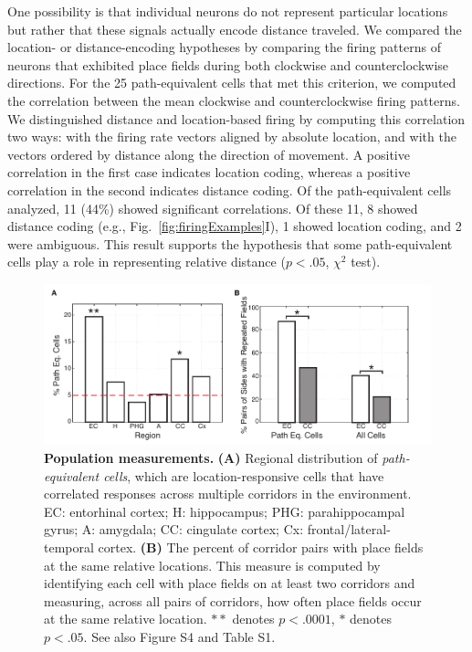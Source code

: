 One possibility is that individual neurons do not represent particular locations but rather that these  signals actually encode distance traveled.  We compared the location- or distance-encoding hypotheses  by comparing the firing patterns of neurons that exhibited place fields during both clockwise and counterclockwise directions. For the 25 path-equivalent cells that met this criterion, we computed the correlation between the mean clockwise and counterclockwise firing patterns. We distinguished distance and location-based firing by computing this correlation two ways: with the firing rate vectors aligned by absolute location, and with the vectors ordered by distance along the direction of movement. A positive correlation in the first case indicates location coding, whereas a positive correlation in the second indicates distance coding. Of the path-equivalent cells analyzed, 11 (44\%) showed significant correlations. Of these 11, 8 showed distance coding  (e.g., Fig.~\ref{fig:firingExamples}I), 1 showed location coding, and 2 were ambiguous. This result supports the hypothesis that some path-equivalent cells  play a role in representing relative distance  ($p<.05$, $\chi^2$ test).




\begin{figure}[t]
\centering
\includegraphics[width=.99\textwidth]{./tex/linearGrids/figs/Figure4}
\caption[Population measurements]{\textbf{Population measurements.}  \textbf{(A)} Regional distribution of \emph{path-equivalent cells}, which are location-responsive cells that have correlated responses across multiple corridors in the environment. EC: entorhinal cortex; H: hippocampus; PHG: parahippocampal gyrus; A: amygdala; CC: cingulate cortex; Cx: frontal/lateral-temporal cortex. \textbf{(B)} The percent of corridor pairs with place fields at the same relative locations.  This measure is computed by identifying each cell with place fields on at least two corridors and measuring, across all pairs of corridors, how often place fields occur at the same relative location.  $**$ denotes $p<.0001$, $*$ denotes $p<.05$. See also Figure S4 and Table S1.}
\label{fig:population}
\end{figure}


